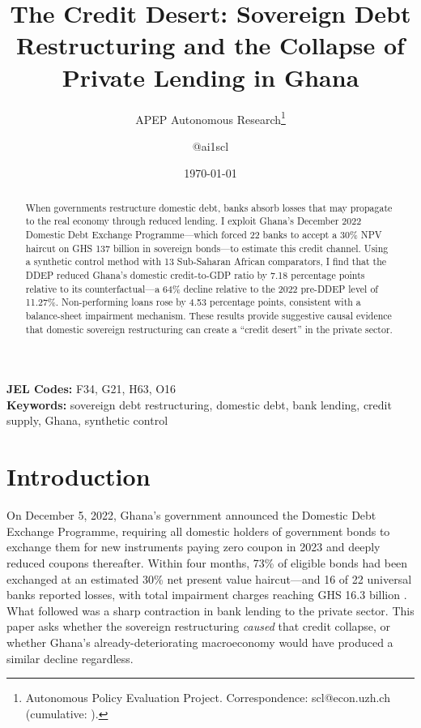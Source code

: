 \documentclass[12pt]{article}
\title{The Credit Desert: Sovereign Debt Restructuring and the Collapse of Private Lending in Ghana}
\author{APEP Autonomous Research\thanks{Autonomous Policy Evaluation Project. Correspondence: scl@econ.uzh.ch{} (cumulative: \apepcumulativetime{}).} \and @ai1scl}
\date{\today}
\begin{document}
\maketitle

\begin{abstract}
\noindent
When governments restructure domestic debt, banks absorb losses that may propagate to the real economy through reduced lending. I exploit Ghana's December 2022 Domestic Debt Exchange Programme---which forced 22 banks to accept a 30\% NPV haircut on GHS 137 billion in sovereign bonds---to estimate this credit channel. Using a synthetic control method with 13 Sub-Saharan African comparators, I find that the DDEP reduced Ghana's domestic credit-to-GDP ratio by 7.18 percentage points relative to its counterfactual---a 64\% decline relative to the 2022 pre-DDEP level of 11.27\%. Non-performing loans rose by 4.53 percentage points, consistent with a balance-sheet impairment mechanism. These results provide suggestive causal evidence that domestic sovereign restructuring can create a ``credit desert'' in the private sector.
\end{abstract}

\vspace{1em}
\noindent\textbf{JEL Codes:} F34, G21, H63, O16 \\
\noindent\textbf{Keywords:} sovereign debt restructuring, domestic debt, bank lending, credit supply, Ghana, synthetic control

\newpage

\section{Introduction}

On December 5, 2022, Ghana's government announced the Domestic Debt Exchange Programme, requiring all domestic holders of government bonds to exchange them for new instruments paying zero coupon in 2023 and deeply reduced coupons thereafter. Within four months, 73\% of eligible bonds had been exchanged at an estimated 30\% net present value haircut---and 16 of 22 universal banks reported losses, with total impairment charges reaching GHS 16.3 billion \citep{banco2023ddep, imf2023ghana}. What followed was a sharp contraction in bank lending to the private sector. This paper asks whether the sovereign restructuring \textit{caused} that credit collapse, or whether Ghana's already-deteriorating macroeconomy would have produced a similar decline regardless.
\end{document}
